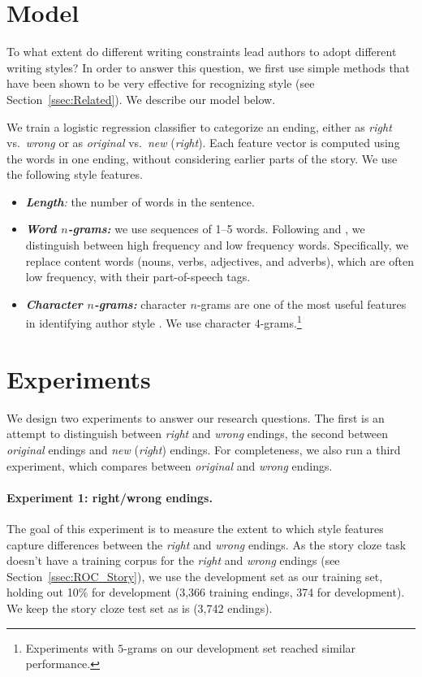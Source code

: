 \documentclass[11pt,a4paper]{article}
\newcommand{\secref}[1]{Section~\ref{ssec:#1}}
\newcommand{\isectionb}[1]{\section{#1}\label{ssec:#1}}
\begin{document}
\isectionb{Model}

To what extent do different writing constraints lead authors to adopt different writing styles?
In order to answer this question, we first use simple methods that have been shown to be very effective for recognizing style (see \secref{Related}).
We describe our model below.

We train a logistic regression classifier to categorize an ending,
either as {\it right} vs.~{\it wrong} or as {\it original} vs.~{\it new} ({\it right}).
Each feature vector is computed using the words in one ending, without considering earlier parts of the story. 
We use the following style features.

\begin{itemize}
\item\textit{\textbf{Length}:} the number of words in the sentence.
\item\textit{\textbf{Word $n$-grams:}} we use sequences of 1--5
  words. Following \citet{Tsur:2010} and \citet{Schwartz:2013}, we distinguish between high frequency and low frequency words. 
Specifically, we replace content words (nouns, verbs, adjectives, and adverbs), which are often low frequency, with their part-of-speech tags.
\item\textit{\textbf{Character $n$-grams:}} character $n$-grams are one of the most useful features in identifying author style \cite{Stamatatos:2009}. 
We use character $4$-grams.\footnote{Experiments with $5$-grams on our development set reached similar performance.}
\end{itemize}

\isectionb{Experiments}
We design two experiments to answer our research questions. 
The first is an attempt to distinguish between {\it right} and {\it wrong} endings,
the second  between {\it original} endings and {\it new} ({\it right}) endings.
For completeness, we also run a third experiment, which compares between {\it original} and {\it wrong} endings. 


\paragraph{Experiment 1: right/wrong endings.}
The goal of this experiment is to measure the extent to which  style features capture differences between the {\it right} and {\it wrong} endings.
As the story cloze task doesn't have a training corpus for the {\it
  right} and {\it wrong} endings (see \secref{ROC_Story}), we use the
development set as our training set, holding out 10\% for development
(3,366 training endings, 374 for development). 
 We keep the story cloze test set as is (3,742 endings).
\end{document}
